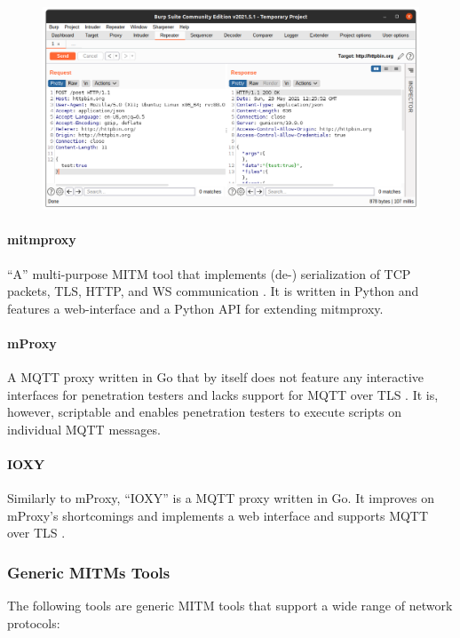 \begin{figure}[h]
    \centering
    \includegraphics[width=14cm]{img/ch03/burpsuite.png}
    \label{fig:burpsuite}
\end{figure}
\paragraph{mitmproxy} %
\enquote A multi-purpose \ac{MITM} tool that implements (de-) serialization of \ac{TCP} packets, \ac{TLS}, \ac{HTTP}, and \ac{WS} communication \cite{mitmproxy}. It is written in Python and features a web-interface and a Python \ac{API} for extending mitmproxy.

\paragraph{mProxy} A \ac{MQTT} proxy written in Go that by itself does not feature any interactive interfaces for penetration testers and lacks support for \ac{MQTT} over \ac{TLS} \cite{mproxy}. It is, however, scriptable and enables penetration testers to execute scripts on individual \ac{MQTT} messages.

\paragraph{IOXY} Similarly to mProxy, \enquote{IOXY} is a \ac{MQTT} proxy written in Go. It improves on mProxy's shortcomings and implements a web interface and supports \ac{MQTT} over \ac{TLS} \cite{ioxy}.
\subsubsection{Generic \acp{MITM} Tools}
The following tools are generic \ac{MITM} tools that support a wide range of network protocols:
